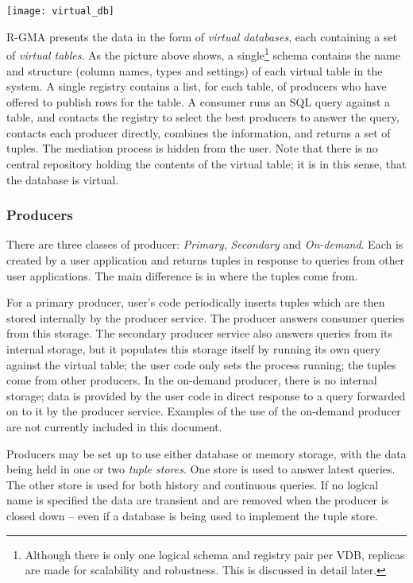 \begin{center}
\texttt{[image: virtual\_db]}
\end{center}

R-GMA presents the data in the form of \emph{virtual databases}, each
containing a set of \emph{virtual tables}. As the picture above shows,
a single\footnote{Although there is only one logical schema and
  registry pair per VDB, replicas are made for scalability and
  robustness. This is discussed in detail later.} schema contains the
name and structure (column names, types and settings) of each virtual
table in the system. A single registry contains a list, for each
table, of producers who have offered to publish rows for the table. A
consumer runs an SQL query against a table, and contacts the registry
to select the best producers to answer the query, contacts each
producer directly, combines the information, and returns a set of
tuples. The mediation process is hidden from the user. Note that there
is no central repository holding the contents of the virtual table; it
is in this sense, that the database is virtual.

\subsubsection{Producers}
\label{sec:producers}
There are three classes of producer: \emph{Primary}, \emph{Secondary}
and \emph{On-demand}. Each is created by a user application and
returns tuples in response to queries from other user
applications. The main difference is in where the tuples come from.

For a primary producer, user's code periodically inserts tuples which
are then stored internally by the producer service. The producer
answers consumer queries from this storage. The secondary producer
service also answers queries from its internal storage, but it
populates this storage itself by running its own query against the
virtual table; the user code only sets the process running; the tuples
come from other producers. In the on-demand producer, there is no
internal storage; data is provided by the user code in direct response
to a query forwarded on to it by the producer service. Examples of the
use of the on-demand producer are not currently included in this
document.

Producers may be set up to use either database or memory storage, with
the data being held in one or two \textit{tuple stores}. One store is
used to answer latest queries. The other store is used for both
history and continuous queries. If no logical name is specified the
data are transient and are removed when the producer is closed down
{--} even if a database is being used to implement the tuple store.

